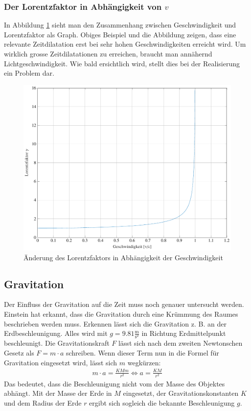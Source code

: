 \begin{refsection}
\subsubsection{Der Lorentzfaktor in Abhängigkeit von $v$}
In Abbildung \ref{skript:zeitreisen:fig:lorentz} sieht man den Zusammenhang zwischen Geschwindigkeit und Lorentzfaktor als Graph. Obiges Beispiel und die Abbildung zeigen, dass eine relevante Zeitdilatation erst bei sehr hohen Geschwindigkeiten erreicht wird. Um wirklich grosse Zeitdilatationen zu erreichen, braucht man annähernd Lichtgeschwindigkeit. Wie bald ersichtlich wird, stellt dies bei der Realisierung ein Problem dar.
\begin{figure}[H]
   \centering
   \includegraphics[width=12cm]{zeitreisen/tikz/lorentz.pdf}
   \caption{Änderung des Lorentzfaktors in Abhängigkeit der Geschwindigkeit}
   \label{skript:zeitreisen:fig:lorentz} 
\end{figure}
\subsection{Gravitation} \label{Gravitation}
	Der Einfluss der Gravitation auf die Zeit muss noch genauer untersucht werden. Einstein hat erkannt, dass die Gravitation durch eine Krümmung des Raumes beschrieben werden muss. Erkennen lässt sich die Gravitation z. B. an der Erdbeschleunigung. Alles wird mit $g=9.81\frac{\text{m}}{\text{s}^2}$ in Richtung Erdmittelpunkt beschleunigt. Die Gravitationskraft $F$ lässt sich nach dem zweiten Newtonschen Gesetz als $F=m\cdot a$ schreiben. Wenn dieser Term nun in die Formel für Gravitation eingesetzt wird, lässt sich $m$ wegkürzen: 
	\begin{align*}
		m\cdot a = \frac{KMm}{r^2} \Leftrightarrow a=\frac{KM}{r^2} 
	\end{align*}
    Das bedeutet, dass die Beschleunigung nicht vom der Masse des Objektes abhängt. Mit der Masse der Erde in $M$ eingesetzt, der Gravitationskonstanten $K$ und dem Radius der Erde $r$ ergibt sich sogleich die bekannte Beschleunigung $g$.
    

\end{refsection}
